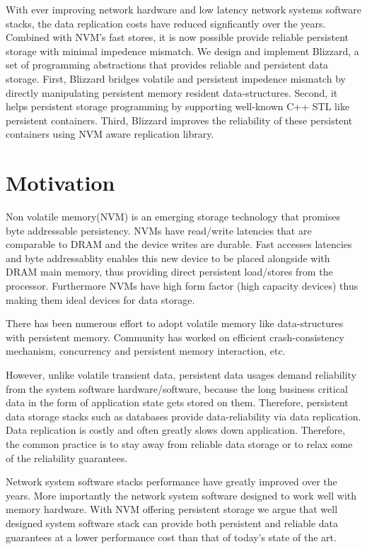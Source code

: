 With ever improving network hardware and low latency network systems software stacks, 
the data replication costs have reduced signficantly over the years. Combined with NVM's
fast stores, it is now possible provide reliable persistent storage with minimal impedence
mismatch. We design and implement Blizzard, a set of programming abstractions that provides 
reliable and persistent data storage. First, Blizzard bridges volatile and persistent impedence
mismatch by directly manipulating persistent memory resident data-structures. Second, it helps
persistent storage programming by supporting well-known C++ STL like persistent containers.
Third, Blizzard improves the reliability of these persistent containers using NVM aware replication library.


\section{Motivation}
Non volatile memory(NVM) is an emerging storage technology that promises byte addressable 
persistency. NVMs have read/write latencies that are comparable to DRAM and the device 
writes are durable. Fast accesses latencies and byte addressablity enables this new device
to be placed alongside with DRAM main memory, thus providing direct persistent load/stores
from the processor. Furthermore NVMs have high form factor (high capacity devices) thus
making them ideal devices for data storage. 

There has been numerous effort to adopt volatile memory like data-structures with persistent
memory. Community has worked on efficient crash-consistency mechanism, concurrency and persistent
memory interaction, etc. 

However, unlike volatile transient data, persistent data usages
demand reliability from the system software hardware/software, because the long business critical data
in the form of application state gets stored on them. Therefore, persistent data storage stacks such
as databases provide data-reliability via data replication. Data replication is costly and often
greatly slows down application. Therefore, the common practice is to stay away from reliable data
storage or to relax some of the reliability guarantees.

Network system software stacks performance have greatly improved over the years. More importantly
the network system software designed to work well with memory hardware. With NVM offering persistent
storage we argue that well designed system software stack can provide both persistent and reliable
data guarantees at a lower performance cost than that of today's state of the art.

